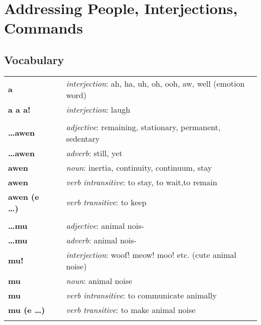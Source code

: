 \section{Addressing People, Interjections, Commands} 
%
\subsection*{Vocabulary}
%
\begin{supertabular}{p{2,5cm}|ll}
%
\textbf{a} && \textit{interjection}: ah, ha, uh, oh, ooh, aw, well (emotion word) \\ %
\textbf{a a a!} && \textit{interjection}: laugh \\ %
 && \\ %
%
\textbf{\dots awen} && \textit{adjective}: remaining, stationary, permanent, sedentary \\ %
\textbf{\dots awen} && \textit{adverb}: still, yet \\ %
\textbf{awen} && \textit{noun}: inertia, continuity, continuum, stay \\ %
\textbf{awen} && \textit{verb intransitive}: to stay, to wait,to remain \\ %
\textbf{awen (e \dots)} && \textit{verb transitive}: to keep \\ %
 && \\ %
%
\textbf{\dots mu} && \textit{adjective}: animal nois- \\ %
\textbf{\dots mu} && \textit{adverb}: animal nois- \\ %
\textbf{mu!} && \textit{interjection}: woof! meow! moo! etc. (cute animal noise) \\ %
\textbf{mu} && \textit{noun}: animal noise \\ %
\textbf{mu} && \textit{verb intransitive}: to communicate animally \\ %
\textbf{mu (e \dots)} && \textit{verb transitive}: to make animal noise \\ %
 && \\ %

\end{supertabular}

